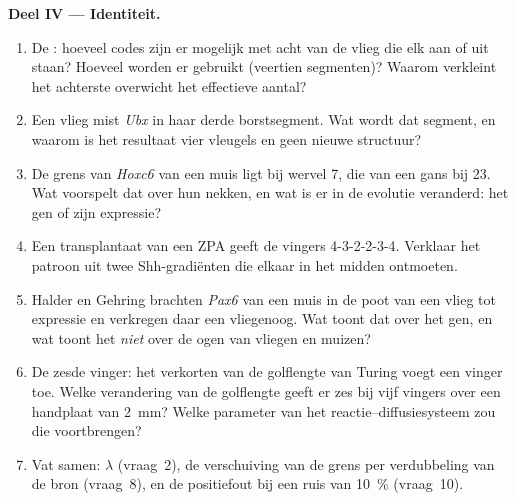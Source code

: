 \begin{problem}
\medskip
\noindent\textbf{Deel IV --- Identiteit.}
\begin{enumerate}[resume]
  \item De : hoeveel codes zijn er mogelijk met acht 
        van de vlieg die elk aan of uit staan? Hoeveel worden er
        gebruikt (veertien segmenten)? Waarom verkleint het achterste
        overwicht het effectieve aantal?
  \item Een vlieg mist \emph{Ubx} in haar derde borstsegment. Wat wordt
        dat segment, en waarom is het resultaat vier vleugels en geen
        nieuwe structuur?
  \item De grens van \emph{Hoxc6} van een muis ligt bij wervel 7, die
        van een gans bij 23. Wat voorspelt dat over hun nekken, en wat
        is er in de evolutie veranderd: het gen of zijn expressie?
  \item Een transplantaat van een ZPA geeft de vingers 4-3-2-2-3-4.
        Verklaar het patroon uit twee Shh-gradiënten die elkaar in het
        midden ontmoeten.
  \item Halder en Gehring brachten \emph{Pax6} van een muis in de poot
        van een vlieg tot expressie en verkregen daar een vliegenoog.
        Wat toont dat over het gen, en wat toont het \emph{niet} over
        de ogen van vliegen en muizen?
  \item De zesde vinger: het verkorten van de golflengte van Turing
        voegt een vinger toe. Welke verandering van de golflengte geeft
        er zes bij vijf vingers over een handplaat van \qty{2}{mm}?
        Welke parameter van het reactie--diffusiesysteem zou die
        voortbrengen?
  \item Vat samen: $\lambda$ (vraag~2), de verschuiving van de grens
        per verdubbeling van de bron (vraag~8), en de positiefout bij
        een ruis van \qty{10}{\%} (vraag~10).
\end{enumerate}
\end{problem}

